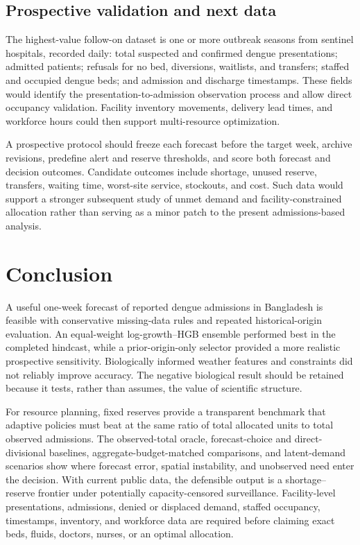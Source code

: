 \documentclass[11pt]{article}
\begin{document}
\subsection{Prospective validation and next data}

The highest-value follow-on dataset is one or more outbreak seasons from sentinel hospitals, recorded daily: total suspected and confirmed dengue presentations; admitted patients; refusals for no bed, diversions, waitlists, and transfers; staffed and occupied dengue beds; and admission and discharge timestamps. These fields would identify the presentation-to-admission observation process and allow direct occupancy validation. Facility inventory movements, delivery lead times, and workforce hours could then support multi-resource optimization.

A prospective protocol should freeze each forecast before the target week, archive revisions, predefine alert and reserve thresholds, and score both forecast and decision outcomes. Candidate outcomes include shortage, unused reserve, transfers, waiting time, worst-site service, stockouts, and cost. Such data would support a stronger subsequent study of unmet demand and facility-constrained allocation rather than serving as a minor patch to the present admissions-based analysis.

\section{Conclusion}

A useful one-week forecast of reported dengue admissions in Bangladesh is feasible with conservative missing-data rules and repeated historical-origin evaluation. An equal-weight log-growth--HGB ensemble performed best in the completed hindcast, while a prior-origin-only selector provided a more realistic prospective sensitivity. Biologically informed weather features and constraints did not reliably improve accuracy. The negative biological result should be retained because it tests, rather than assumes, the value of scientific structure.

For resource planning, fixed reserves provide a transparent benchmark that adaptive policies must beat at the same ratio of total allocated units to total observed admissions. The observed-total oracle, forecast-choice and direct-divisional baselines, aggregate-budget-matched comparisons, and latent-demand scenarios show where forecast error, spatial instability, and unobserved need enter the decision. With current public data, the defensible output is a shortage--reserve frontier under potentially capacity-censored surveillance. Facility-level presentations, admissions, denied or displaced demand, staffed occupancy, timestamps, inventory, and workforce data are required before claiming exact beds, fluids, doctors, nurses, or an optimal allocation.
\end{document}
